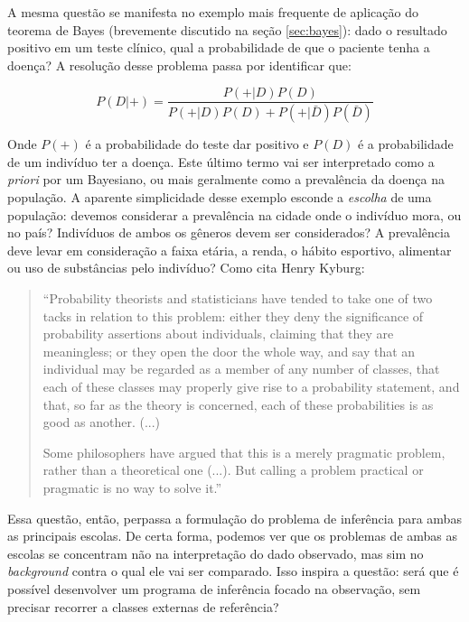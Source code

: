 A mesma questão se manifesta no exemplo mais frequente de aplicação do teorema de Bayes (brevemente discutido
na seção \ref{sec:bayes}): dado o resultado positivo em um
teste clínico, qual a probabilidade de que o paciente tenha a doença? A resolução desse problema passa por identificar que:

\begin{equation}
P(D|+) = \frac{P(+|D)P(D)}{P(+|D)P(D)+P(+|\bar D) P(\bar D)}
\end{equation}

Onde $P(+)$ é a probabilidade do teste dar positivo 
e $P(D)$ é a probabilidade de um
indivíduo ter a doença. Este último termo vai ser interpretado como a {\em priori} por um Bayesiano, ou mais geralmente
como a prevalência da doença na população. A aparente simplicidade desse exemplo esconde a {\em escolha} de uma população:
devemos considerar a prevalência na cidade onde o indivíduo mora, ou no país? Indivíduos de ambos os gêneros devem ser
considerados? A prevalência deve levar em consideração a faixa etária, a renda, o hábito esportivo, alimentar ou uso de
substâncias pelo indivíduo? Como cita Henry Kyburg:

\begin{quote}
``Probability theorists and statisticians have tended to take one of two tacks in relation to this problem:
either they deny the significance of probability assertions about individuals, claiming that they are meaningless;
or they open the door the whole way, and say that an individual may be regarded as a member of any number of classes, 
that each of these classes may properly give rise to a probability statement, and that, so far as the theory is concerned,
each of these probabilities is as good as another. (...)

Some philosophers have argued that this is a merely pragmatic problem, rather than a theoretical one (...). But calling
a problem practical or pragmatic is no way to solve it.'' \citep{Kyburg74}
\end{quote}

Essa questão, então, perpassa a formulação do problema de inferência para ambas as principais escolas. De certa forma,
podemos ver que os problemas de ambas as escolas se concentram não na interpretação do dado observado, mas sim
no {\em background} contra o qual ele vai ser comparado. Isso inspira a questão: será que é possível desenvolver
um programa de inferência focado na observação, sem precisar recorrer a classes externas de referência?

